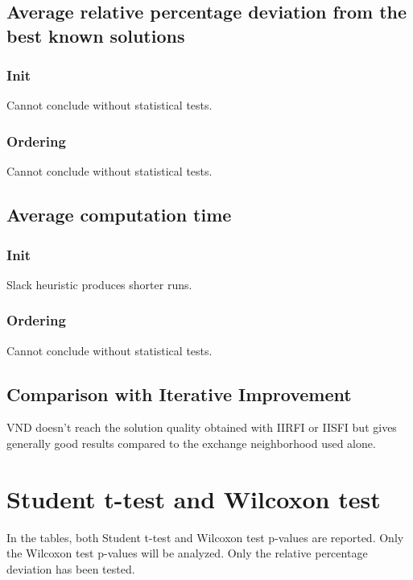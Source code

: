 \documentclass[a4paper,12pt]{article}
\begin{document}
\subsection{Average relative percentage deviation from the best known solutions}

\subsubsection{Init}

Cannot conclude without statistical tests.

\subsubsection{Ordering}

Cannot conclude without statistical tests.

\subsection{Average computation time}


\subsubsection{Init}

Slack heuristic produces shorter runs.

\subsubsection{Ordering}

Cannot conclude without statistical tests.




\subsection{Comparison with Iterative Improvement}


VND doesn't reach the solution quality obtained with IIRFI or IISFI but gives generally good results compared to the exchange neighborhood used alone.
\newpage\cleardoublepage{}
\section{Student t-test and Wilcoxon test}

In the tables, both Student t-test and Wilcoxon test p-values are reported. Only the Wilcoxon test p-values will be analyzed. Only the relative percentage deviation has been tested.
\end{document}
